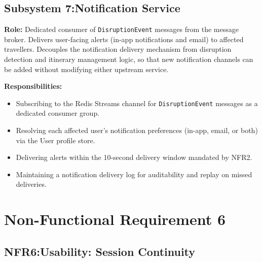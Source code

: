 \documentclass[12pt,a4paper]{article}
\begin{document}
\subsection{Subsystem 7:Notification Service}

\textbf{Role:} Dedicated consumer of \texttt{DisruptionEvent} messages from the message broker.
Delivers user-facing alerts (in-app notifications and email) to affected travellers. Decouples
the notification delivery mechanism from disruption detection and itinerary management logic,
so that new notification channels can be added without modifying either upstream service.

\textbf{Responsibilities:}
\begin{itemize}[noitemsep]
  \item Subscribing to the Redis Streams channel for \texttt{DisruptionEvent} messages as a
        dedicated consumer group.
  \item Resolving each affected user's notification preferences (in-app, email, or both) via
        the User profile store.
  \item Delivering alerts within the 10-second delivery window mandated by NFR2.
  \item Maintaining a notification delivery log for auditability and replay on missed deliveries.
\end{itemize}

\section{Non-Functional Requirement 6}

\subsection{NFR6:Usability: Session Continuity}
\end{document}
